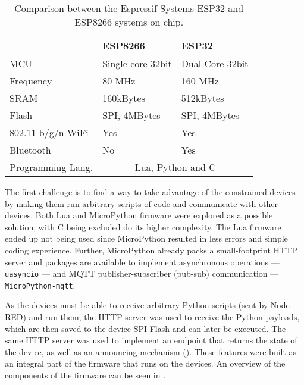 \begin{table}[]
\centering
\begin{tabular}{@{}lll@{}}
\toprule
                   & \textbf{ESP8266}                   & \textbf{ESP32}                       \\ \midrule
MCU                & Single-core 32bit         & Dual-Core 32bit \\
Frequency          & 80 MHz                    & 160 MHz                     \\
SRAM               & 160kBytes                 & 512kBytes                   \\
Flash              & SPI, 4MBytes             & SPI, 4MBytes               \\
802.11 b/g/n WiFi  & Yes                       & Yes                         \\
Bluetooth          & No                        & Yes                         \\
Programming Lang.  & \multicolumn{2}{c}{Lua, Python and C} \\ \bottomrule
\end{tabular}
\caption{Comparison between the Espressif Systems ESP32 and ESP8266 systems on chip.}
\label{tab:esps}
\end{table}

The first challenge is to find a way to take advantage of the constrained devices by making them run arbitrary scripts of code and communicate with other devices. Both Lua and MicroPython firmware were explored as a possible solution, with C being excluded do its higher complexity. The Lua firmware ended up not being used since MicroPython resulted in less errors and simple coding experience. Further, MicroPython already packs a small-footprint HTTP server and packages are available to implement asynchronous operations --- \ie \texttt{uasyncio} --- and MQTT publisher-subscriber (\viz pub-sub) communication --- \ie \texttt{MicroPython-mqtt}.

As the devices must be able to receive arbitrary Python scripts (sent by Node-RED) and run them, the HTTP server was used to receive the Python payloads, which are then saved to the device SPI Flash and can later be executed. The same HTTP server was used to implement an endpoint that returns the state of the device, as well as an announcing mechanism (). These features were built as an integral part of the firmware that runs on the devices. An overview of the components of the firmware can be seen in .

